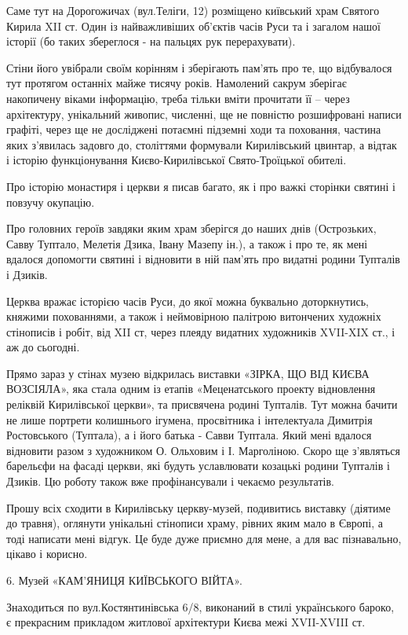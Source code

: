 Саме тут на Дорогожичах (вул.Теліги, 12) розміщено київський храм Святого
Кирила XII ст.  Один із найважливіших об’єктів часів Руси та і загалом нашої
історії (бо таких збереглося - на пальцях рук перерахувати).

Стіни його увібрали своїм корінням і зберігають пам’ять про те, що відбувалося
тут протягом останніх майже тисячу років. Намолений сакрум зберігає накопичену
віками інформацію, треба тільки вміти прочитати її – через архітектуру,
унікальний живопис, численні, ще не повністю розшифровані написи графіті, через
ще не досліджені потаємні підземні ходи та поховання, частина яких з'явилась
задовго до, століттями формували Кирилівський цвинтар, а відтак і історію
функціонування Києво-Кирилівської Свято-Троїцької обителі.

Про історію монастиря і церкви я писав багато, як і про важкі сторінки святині
і повзучу окупацію.

Про головних героїв завдяки яким храм зберігся до наших днів (Острозьких, Савву
Туптало, Мелетія Дзика, Івану Мазепу ін.), а також і про те, як мені вдалося
допомогти святині і відновити в ній пам’ять про видатні родини Тупталів і
Дзиків.

Церква вражає історією часів Руси, до якої можна буквально доторкнутись,
княжими похованнями, а також і неймовірною палітрою витончених художніх
стінописів і робіт, від XII ст, через плеяду видатних художників XVII-XIX ст.,
і аж до сьогодні.

Прямо зараз у стінах музею відкрилась виставки «ЗІРКА, ЩО ВІД КИЄВА ВОЗСІЯЛА»,
яка стала одним із етапів «Меценатського проекту відновлення реліквій
Кирилівської церкви», та присвячена родині Тупталів. Тут можна бачити не лише
портрети колишнього ігумена, просвітника і інтелектуала Димитрія Ростовського
(Туптала), а і його батька - Савви Туптала. Який мені вдалося відновити разом з
художником О. Ольховим і І. Марголіною. Скоро ще з’являться барельєфи на фасаді
церкви, які будуть уславлювати козацькі родини Тупталів і Дзиків. Цю роботу
також вже профінансували і чекаємо результатів.

Прошу всіх сходити в Кирилівську церкву-музей, подивитись виставку (діятиме до
травня), оглянути унікальні стінописи храму, рівних яким мало в Європі, а тоді
написати мені відгук. Це буде дуже приємно для мене, а для вас пізнавально,
цікаво і корисно.

6. Музей «КАМ’ЯНИЦЯ КИЇВСЬКОГО ВІЙТА».

Знаходиться по вул.Костянтинівська 6/8, виконаний в стилі українського бароко,
є прекрасним прикладом житлової архітектури Києва межі XVII-XVIII ст.

